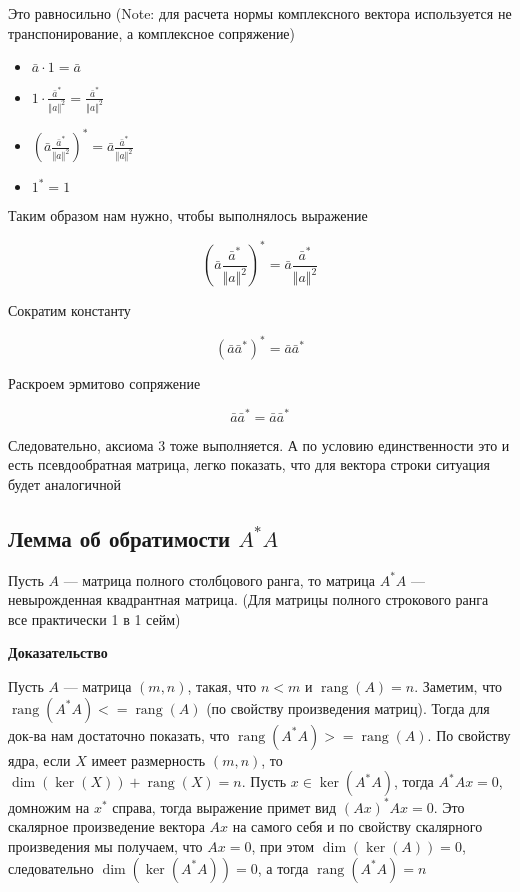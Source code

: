 \documentclass{article}
\begin{document}
    Это равносильно
    (Note: для расчета нормы комплексного вектора используется не транспонирование, а комплексное сопряжение)

    \begin{itemize}
        \item $  \bar{a} \cdot 1 =  \bar{a}$
        \item $1 \cdot \frac{\bar{a}^{*}}{\Vert a \Vert^{2}} = \frac{\bar{a}^{*}}{\Vert a \Vert^{2}}$
        \item $(\bar{a} \frac{\bar{a}^{*}}{\Vert a \Vert^{2}})^{*} = \bar{a} \frac{\bar{a}^{*}}{\Vert a \Vert^{2}}$
        \item $1^{*} = 1$
    \end{itemize}

    Таким образом нам нужно, чтобы выполнялось выражение

    \begin{equation}
        (\bar{a} \frac{\bar{a}^{*}}{\Vert a \Vert^{2}})^{*} = \bar{a} \frac{\bar{a}^{*}}{\Vert a \Vert^{2}}
    \end{equation}

    Сократим константу

    \begin{equation}
        (\bar{a} \bar{a}^{*})^{*} = \bar{a} \bar{a}^{*}
    \end{equation}

    Раскроем эрмитово сопряжение

    \begin{equation}
        \bar{a} \bar{a}^{*} = \bar{a} \bar{a}^{*}
    \end{equation}

    Следовательно, аксиома 3 тоже выполняется.
    А по условию единственности это и есть псевдообратная матрица, легко показать, что для вектора строки ситуация будет аналогичной

    \subsection{Лемма об обратимости $A^{*} A$}

    Пусть $A$ --- матрица полного столбцового ранга, то матрица $A^{*} A$ --- невырожденная квадрантная матрица.
    (Для матрицы полного строкового ранга все практически 1 в 1 сейм)

    \quad

    \textbf{Доказательство}

    Пусть $A$ --- матрица $(m, n)$, такая, что $n < m$ и $\operatorname{rang}(A) = n$.
    Заметим, что $\operatorname{rang}(A^{*} A) <= \operatorname{rang}(A)$ (по свойству произведения матриц).
    Тогда для док-ва нам достаточно показать, что $\operatorname{rang}(A^{*} A) >= \operatorname{rang}(A)$.
    По свойству ядра, если $X$ имеет размерность $(m, n)$, то $\dim(\ker(X)) + \operatorname{rang}(X) = n$.
    Пусть $x \in \ker(A^{*} A)$, тогда $A^{*} A x = 0$, домножим на $x^{*}$ справа, тогда выражение примет вид
    $(Ax)^{*} Ax = 0$.
    Это скалярное произведение вектора $Ax$ на самого себя и по свойству скалярного произведения мы получаем, что
    $Ax = 0$, при этом $\dim(\ker(A)) = 0$, следовательно $\dim(\ker(A^{*} A)) = 0$, а тогда $\operatorname{rang}(A^{*} A) = n$
\end{document}
